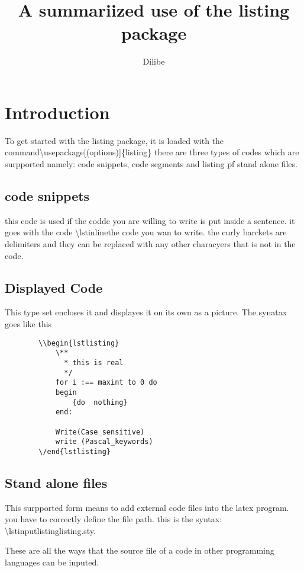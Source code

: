 \documentclass{article}
\title{A summariized use of the listing package}
\author{Dilibe}
\begin{document}
	\maketitle
	\tableofcontents
	\section{Introduction}
	To get started with the listing package, it is loaded with the command\textbackslash usepackage[(options)]\{listing\}
		there are three types of codes which are surpported namely: code snippets, code segments and listing pf stand alone files.
	\subsection{code snippets}
		this code is used if the codde you are willing to write is put inside a sentence.
		it goes with the code \textbackslash lstinline{the code you wan to write}. the curly barckets are delimiters and they can be replaced with any other characyers that is not in the code.
	\subsection{Displayed Code}
		This type set encloses it and displayes it on its own as a picture. The synatax goes like this
		\begin{lstlisting}
		\\begin{lstlisting}
			\**
			  * this is real
			  */
			for i :== maxint to 0 do
			begin
				{do  nothing}
			end:
			
			Write(Case_sensitive)
			write (Pascal_keywords)
		\/end{lstlisting}
		\end{lstlisting}
	\subsection{Stand alone files}
		This surpported form means to add external code files into the latex program. you have to correctly define the file path. this is the syntax: \textbackslash lstinputlisting{listing.sty}.
		
	These are all the ways that the source file of a code in other programming languages can be inputed.
	
\end{document}
